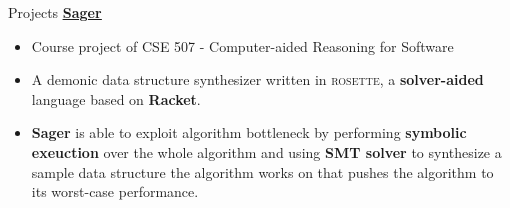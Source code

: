 \documentclass{cv}
\newcommand{\myul}[2][blue]{\setulcolor{#1}\ul{#2}\setulcolor{blue}}
\begin{document}
\begin{rSection}{Projects}
		\textbf{\href{https://github.com/AD1024/Sager}{\color{blue} \myul{Sager}}} %
		\begin{itemize}
			\setlength{\itemsep}{1pt}
            \setlength{\parskip}{0pt}
			\setlength{\parsep}{0pt}
			\item Course project of CSE 507 - Computer-aided Reasoning for Software
			\item A demonic data structure synthesizer written in \textsc{rosette}, a \textbf{solver-aided} language based on \textbf{Racket}.
			\item \textbf{Sager} is able to exploit algorithm bottleneck by performing \textbf{symbolic exeuction} over the whole algorithm and using \textbf{SMT solver} to synthesize a sample data structure the algorithm works on that pushes the algorithm to its worst-case performance.
		\end{itemize}
	\end{rSection}
\end{document}
